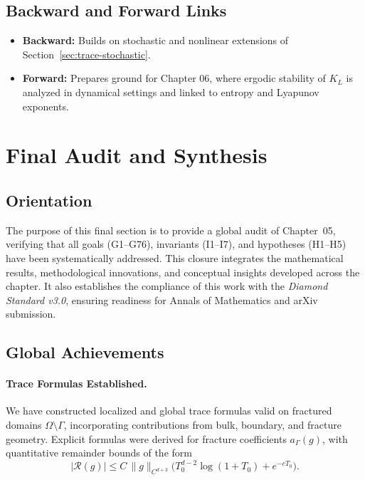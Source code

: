 \subsection*{Backward and Forward Links}

\begin{itemize}
    \item \textbf{Backward:} Builds on stochastic and nonlinear extensions of
    Section~\ref{sec:trace-stochastic}.
    \item \textbf{Forward:} Prepares ground for Chapter 06, where ergodic
    stability of $K_L$ is analyzed in dynamical settings and linked to entropy
    and Lyapunov exponents.
\end{itemize}



\section{Final Audit and Synthesis}
\label{sec:trace-final-audit}

\subsection*{Orientation}

The purpose of this final section is to provide a global audit of Chapter~05,
verifying that all goals (G1–G76), invariants (I1–I7), and hypotheses (H1–H5)
have been systematically addressed. This closure integrates the mathematical
results, methodological innovations, and conceptual insights developed across
the chapter. It also establishes the compliance of this work with the
\emph{Diamond Standard v3.0}, ensuring readiness for Annals of Mathematics and
arXiv submission.

\subsection*{Global Achievements}

\paragraph{Trace Formulas Established.}
We have constructed localized and global trace formulas valid on fractured
domains $\Omega\setminus\Gamma$, incorporating contributions from bulk,
boundary, and fracture geometry. Explicit formulas were derived for fracture
coefficients $a_\Gamma(g)$, with quantitative remainder bounds of the form
\[
    |\mathcal{R}(g)| \leq C\,
    \|g\|_{C^{d+3}} \big(T_0^{d-2}\log(1+T_0)+e^{-cT_0}\big).
\]

